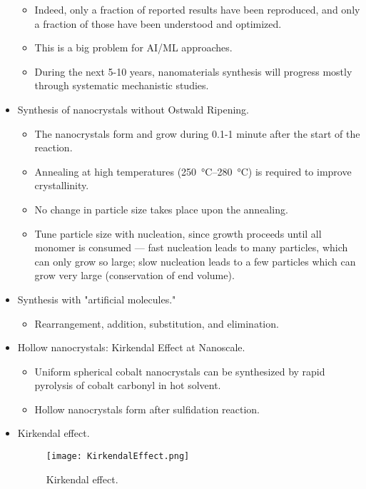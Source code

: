 \documentclass[../notes.tex]{subfiles}
\begin{document}
\begin{itemize}
\begin{itemize}
        \item Indeed, only a fraction of reported results have been reproduced, and only a fraction of those have been understood and optimized.
        \item This is a big problem for AI/ML approaches.
        \item During the next 5-10 years, nanomaterials synthesis will progress mostly through systematic mechanistic studies.
    \end{itemize}
    \item Synthesis of nanocrystals without Ostwald Ripening.
    \begin{itemize}
        \item The nanocrystals form and grow during 0.1-1 minute after the start of the reaction.
        \item Annealing at high temperatures (\SIrange{250}{280}{\celsius}) is required to improve crystallinity.
        \item No change in particle size takes place upon the annealing.
        \item Tune particle size with nucleation, since growth proceeds until all monomer is consumed --- fast nucleation leads to many particles, which can only grow so large; slow nucleation leads to a few particles which can grow very large (conservation of end volume).
    \end{itemize}
    \item Synthesis with "artificial molecules."
    \begin{itemize}
        \item Rearrangement, addition, substitution, and elimination.
    \end{itemize}
    \item Hollow nanocrystals: Kirkendal Effect at Nanoscale.
    \begin{itemize}
        \item Uniform spherical cobalt nanocrystals can be synthesized by rapid pyrolysis of cobalt carbonyl in hot solvent.
        \item Hollow nanocrystals form after sulfidation reaction.
    \end{itemize}
    \item Kirkendal effect.
    \begin{figure}[h!]
        \centering
        \texttt{[image: KirkendalEffect.png]}
        \caption{Kirkendal effect.}
        \label{fig:KirkendalEffect}
    \end{figure}

\end{itemize}
\end{document}
